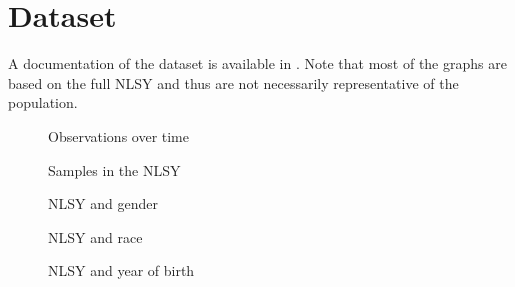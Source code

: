 \FloatBarrier\section{Dataset}
A documentation of the dataset is available in \cite{NLSY.2014}. Note that most of the graphs are based on the full NLSY and thus are not necessarily representative of the population.

\begin{figure}[htp]\centering
\caption{Observations over time}
\end{figure}

\begin{figure}[htp]\centering
\caption{Samples in the NLSY}
\end{figure}

\begin{figure}[htp]\centering
\caption{NLSY and gender}
\end{figure}

\begin{figure}[htp]\centering
\caption{NLSY and race}
\end{figure}

\begin{figure}[htp]\centering
\caption{NLSY and year of birth}
\end{figure}
